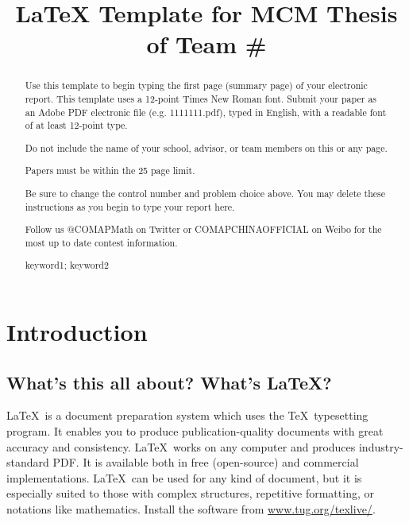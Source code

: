 \documentclass{mcmthesis}
\title{\LaTeX{} Template for MCM Thesis of Team \#\TeamNumber}
\author{}
\date{}
\begin{document}
\begin{abstract}
Use this template to begin typing the first page (summary page) of your electronic report. This template uses a 12-point Times New Roman font. Submit your paper as an Adobe PDF electronic file (e.g. 1111111.pdf), typed in English, with a readable font of at least 12-point type.

Do not include the name of your school, advisor, or team members on this or any page.

Papers must be within the \textcolor[rgb]{1,0,0}{25 page} limit.

Be sure to change the control number and problem choice above.
You may delete these instructions as you begin to type your report here.

Follow us @COMAPMath on Twitter or COMAPCHINAOFFICIAL on Weibo for the most up to date contest information.

\begin{keywords}
keyword1; keyword2
\end{keywords}
\end{abstract}

\maketitle

\tableofcontents
\newpage


\memodate{\today}
\begin{memo}[Memorandum]
  \lipsum[1-3]
\end{memo}


\section{Introduction}
\subsection{What's this all about? What's \LaTeX?}
\LaTeX\ is a document preparation system which uses the \TeX\
typesetting program. It enables you to produce
publication-quality documents with great accuracy and
consistency. \LaTeX\ works on any computer and produces
industry-standard PDF. It is available both in free (open-source)
and commercial implementations. \LaTeX\ can be used for any kind
of document, but it is especially suited to those with complex
structures, repetitive formatting, or notations like
mathematics. Install the software from
\url{www.tug.org/texlive/}.
\end{document}
